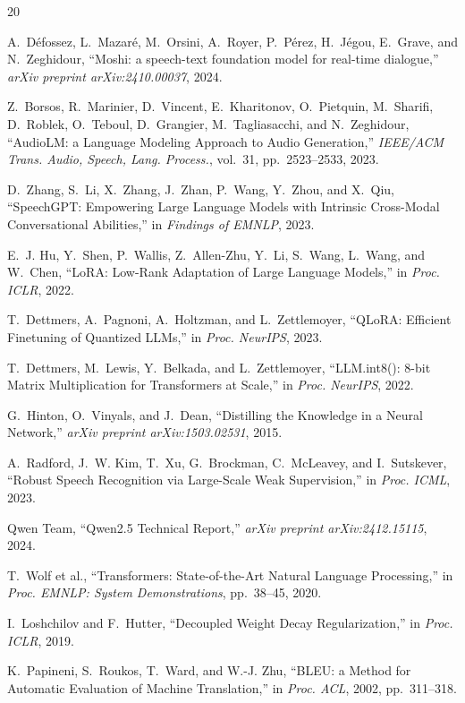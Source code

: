 \documentclass[conference]{IEEEtran}
\begin{document}
\begin{thebibliography}{20}

A.~D\'efossez, L.~Mazar\'e, M.~Orsini, A.~Royer, P.~P\'erez, H.~J\'egou, E.~Grave, and N.~Zeghidour, ``Moshi: a speech-text foundation model for real-time dialogue,'' \emph{arXiv preprint arXiv:2410.00037}, 2024.

Z.~Borsos, R.~Marinier, D.~Vincent, E.~Kharitonov, O.~Pietquin, M.~Sharifi, D.~Roblek, O.~Teboul, D.~Grangier, M.~Tagliasacchi, and N.~Zeghidour, ``AudioLM: a Language Modeling Approach to Audio Generation,'' \emph{IEEE/ACM Trans. Audio, Speech, Lang. Process.}, vol.~31, pp.~2523--2533, 2023.

D.~Zhang, S.~Li, X.~Zhang, J.~Zhan, P.~Wang, Y.~Zhou, and X.~Qiu, ``SpeechGPT: Empowering Large Language Models with Intrinsic Cross-Modal Conversational Abilities,'' in \emph{Findings of EMNLP}, 2023.

E.~J. Hu, Y.~Shen, P.~Wallis, Z.~Allen-Zhu, Y.~Li, S.~Wang, L.~Wang, and W.~Chen, ``LoRA: Low-Rank Adaptation of Large Language Models,'' in \emph{Proc. ICLR}, 2022.

T.~Dettmers, A.~Pagnoni, A.~Holtzman, and L.~Zettlemoyer, ``QLoRA: Efficient Finetuning of Quantized LLMs,'' in \emph{Proc. NeurIPS}, 2023.

T.~Dettmers, M.~Lewis, Y.~Belkada, and L.~Zettlemoyer, ``LLM.int8(): 8-bit Matrix Multiplication for Transformers at Scale,'' in \emph{Proc. NeurIPS}, 2022.

G.~Hinton, O.~Vinyals, and J.~Dean, ``Distilling the Knowledge in a Neural Network,'' \emph{arXiv preprint arXiv:1503.02531}, 2015.

A.~Radford, J.~W. Kim, T.~Xu, G.~Brockman, C.~McLeavey, and I.~Sutskever, ``Robust Speech Recognition via Large-Scale Weak Supervision,'' in \emph{Proc. ICML}, 2023.

Qwen Team, ``Qwen2.5 Technical Report,'' \emph{arXiv preprint arXiv:2412.15115}, 2024.

T.~Wolf et al., ``Transformers: State-of-the-Art Natural Language Processing,'' in \emph{Proc. EMNLP: System Demonstrations}, pp.~38--45, 2020.

I.~Loshchilov and F.~Hutter, ``Decoupled Weight Decay Regularization,'' in \emph{Proc. ICLR}, 2019.

K.~Papineni, S.~Roukos, T.~Ward, and W.-J. Zhu, ``BLEU: a Method for Automatic Evaluation of Machine Translation,'' in \emph{Proc. ACL}, 2002, pp.~311--318.


\end{thebibliography}
\end{document}
